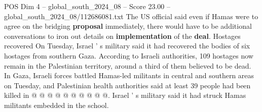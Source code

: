 \begin{textsample}{POS Dim 4 – global\_south\_2024\_08 – Score 23.00 – global\_south\_2024\_08/112686081.txt}
The US official said even if Hamas were to agree on the bridging \textbf{proposal} immediately, there would have to be additional conversations to iron out details on \textbf{implementation} of the \textbf{deal}.
Hostages recovered On Tuesday, Israel ' s military said it had recovered the bodies of six hostages from southern Gaza.
According to Israeli authorities, 109 hostages now remain in the Palestinian territory, around a third of them believed to be dead.
In Gaza, Israeli forces battled Hamas-led militants in central and southern areas on Tuesday, and Palestinian health authorities said at least 39 people had been killed in @ @ @ @ @ @ @ @ @ @.
Israel ' s military said it had struck Hamas militants embedded in the school.

\end{textsample}
